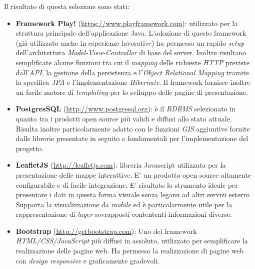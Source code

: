 Il risultato di questa selezione sono stati:
\begin{itemize}
\item \textbf{Framework Play!} (\url{https://www.playframework.com}): utilizzato per la struttura principale dell'applicazione Java. L'adozione di questo framework (già utilizzato anche in esperienze lavorative) ha permesso un rapido \emph{setup} dell'architettura \emph{Model-View-Controller} di base del server. Inoltre risultano semplificate alcune funzioni tra cui il \emph{mapping} delle richieste \emph{HTTP} previste dall'\emph{API}, la gestione della persistenza e l'\emph{Object Relational Mapping} tramite la specifica \emph{JPA} e l'implementazione \emph{Hibernate}. Il framework fornisce inoltre un facile motore di \emph{templating} per lo sviluppo delle pagine di presentazione.
\item \textbf{PostgresSQL} (\url{http://www.postgresql.org}): è il \emph{RDBMS} selezionato in quanto tra i prodotti open source più validi e diffusi allo stato attuale. Risulta inoltre particolarmente adatto con le funzioni \emph{GIS} aggiuntive fornite dalle librerie presentate in seguito e fondamentali per l'implementazione del progetto.
\item \textbf{LeafletJS} (\url{http://leafletjs.com}): libreria Javascript utilizzata per la presentazione delle mappe interattive. E' un prodotto open source altamente configurabile e di facile integrazione. E' risultato lo strumento ideale per presentare i dati in questa forma visuale senza legarsi ad altri servizi esterni. Supporta la visualizzazione da \emph{mobile} ed è particolarmente utile per la rappresentazione di \emph{layer} sovrapposti contententi informazioni diverse.
\item \textbf{Bootstrap} (\url{http://getbootstrap.com}): Uno dei framework \emph{HTML/CSS/JavaScript} più diffusi in assoluto, utilizzato per semplificare la realizzazione delle pagine web. Ha permesso la realizzazione di pagine web con \emph{design responsive} e graficamente gradevoli.
\end{itemize}
